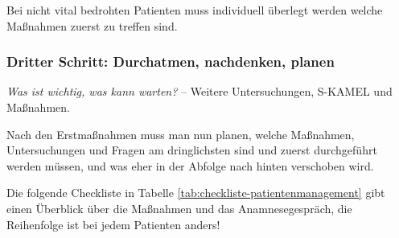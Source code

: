 Bei
nicht vital bedrohten Patienten muss individuell überlegt werden welche
Maßnahmen zuerst zu treffen sind. 

\subsubsection{Dritter Schritt: Durchatmen, nachdenken,
planen}

\emph{Was ist wichtig, was kann warten?} -- Weitere Untersuchungen, S-KAMEL und
Maßnahmen.

Nach den Erstmaßnahmen muss man nun planen, welche Maßnahmen,
Untersuchungen und Fragen am dringlichsten sind und zuerst durchgeführt
werden müssen, und was eher in der Abfolge nach hinten ver\-schoben
wird. 

Die folgende Checkliste in Tabelle \ref{tab:checkliste-patientenmanagement} gibt
einen Überblick über die Maßnahmen und das Anamnese\-ge\-spr\"ach, die
Reihenfolge ist bei jedem Patienten anders!



